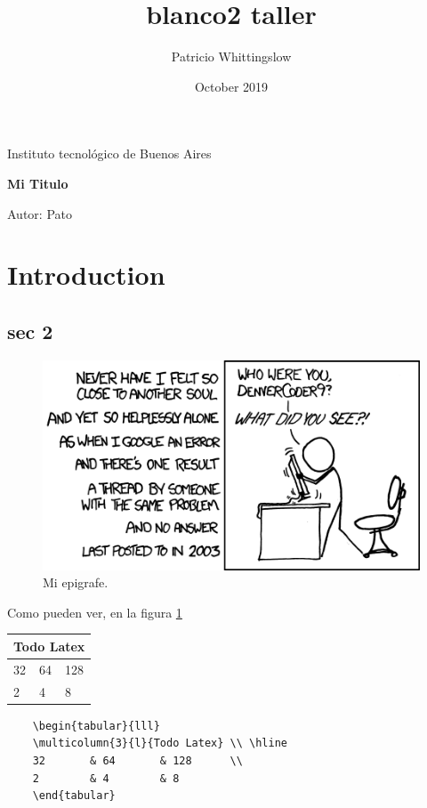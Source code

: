 \documentclass[titlepage]{article}
\title{blanco2 taller}
\author{Patricio Whittingslow}
\date{October 2019}
\begin{document}
\begin{titlepage}
\centering
{Instituto tecnológico de Buenos Aires \par}
\vspace{5cm}

 {\Huge \bf Mi Titulo \par }
 
\vspace{2cm}

{\Large \sc Autor: Pato \par}

\vspace{1cm}

\end{titlepage}

\begin{abstract}
    \lipsum[1]
\end{abstract}

\tableofcontents

\clearpage

\section{Introduction}
\subsection{sec 2}
\begin{figure}[h!] 
    \centering
    \includegraphics[width=\textwidth]{comic.png}
    \caption{Mi epigrafe.}
    \label{fig:miComicFavorito}
\end{figure}

Como pueden ver, en la figura \ref{fig:miComicFavorito}

\vspace{5mm}

\begin{tabular}{lll}
	\multicolumn{3}{l}{Todo Latex} \\ \hline
	32       & 64       & 128      \\
	2        & 4        & 8       
\end{tabular}
\begin{verbatim}
	\begin{tabular}{lll}
	\multicolumn{3}{l}{Todo Latex} \\ \hline
	32       & 64       & 128      \\
	2        & 4        & 8       
	\end{tabular}
\end{verbatim}
\end{document}
